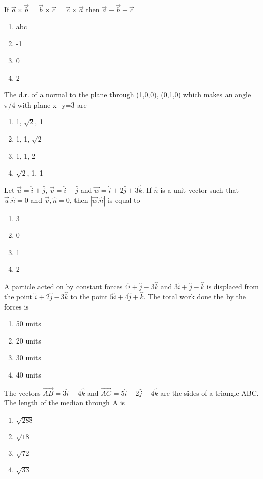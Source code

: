 \item If $\overrightarrow{a} \times \overrightarrow{b} = \overrightarrow{b} \times \overrightarrow{c} = \overrightarrow{c} \times \overrightarrow{a}$ then $\overrightarrow{a}+\overrightarrow{b}+\overrightarrow{c}$=
\begin{enumerate}
\item abc
\item -1
\item 0
\item 2
\end{enumerate}

\item The d.r. of a normal to the plane through (1,0,0), (0,1,0) which makes an angle $\pi/4$ with plane x+y=3 are
\begin{enumerate}
\item 1, $\sqrt{2}$, 1
\item 1, 1, $\sqrt{2}$
\item 1, 1, 2
\item $\sqrt{2}$, 1, 1
\end{enumerate}

\item Let $\overrightarrow{u}=\hat{i}+\hat{j}$, $\overrightarrow{v}=\hat{i}-\hat{j}$ and $\overrightarrow{w}=\hat{i}+2\hat{j}+3\hat{k}$. If $\hat{n}$ is a unit vector such that $\overrightarrow{u}.\hat{n}=0$ and $\overrightarrow{v},\hat{n}=0$, then $|\overrightarrow{w}.\hat{n}|$ is equal to
\begin{enumerate}
\item 3
\item 0
\item 1
\item 2
\end{enumerate}

\item A particle acted on by constant forces $4\hat{i}+\hat{j}-3\hat{k}$ and $3\hat{i}+\hat{j}-\hat{k}$ is displaced from the point $\hat{i}+2\hat{j}-3\hat{k}$ to the point $5\hat{i}+4\hat{j}+\hat{k}$. The total work done the by the forces is
\begin{enumerate}
\item 50 units
\item 20 units
\item 30 units
\item 40 units
\end{enumerate}

\item The vectors $\overrightarrow{AB}=3\hat{i}+4\hat{k}$ and $\overrightarrow{AC}=5\hat{i}-2\hat{j}+4\hat{k}$ are the sides of a triangle ABC. The length of the median through A is
\begin{enumerate}
\item $\sqrt{288}$
\item $\sqrt{18}$
\item $\sqrt{72}$
\item $\sqrt{33}$
\end{enumerate}


